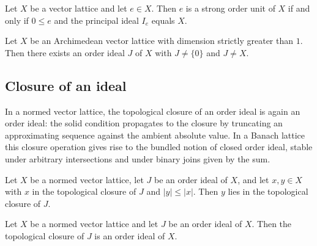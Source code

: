 \begin{theorem}
\label{thm:orderIdeal-strongOrderUnit-iff-principal-eq-top}
\leanok
{}
Let $X$ be a vector lattice and let $e \in X$. Then $e$ is a strong order
unit of $X$ if and only if $0 \le e$ and the principal ideal $I_e$ equals
$X$.
\end{theorem}

\begin{theorem}
\label{thm:orderIdeal-exists-proper-nontrivial}
\leanok
{}
Let $X$ be an Archimedean vector lattice with dimension strictly
greater than $1$. Then there exists an order ideal $J$ of $X$ with
$J \ne \{0\}$ and $J \ne X$.
\end{theorem}

\subsection{Closure of an ideal}

In a normed vector lattice, the topological closure of an order
ideal is again an order ideal: the solid condition propagates to
the closure by truncating an approximating sequence against the
ambient absolute value. In a Banach lattice this closure operation
gives rise to the bundled notion of closed order ideal, stable
under arbitrary intersections and under binary joins given by the
sum.

\begin{lemma}
\label{lem:orderIdeal-topologicalClosure-solid}
\leanok
{}
Let $X$ be a normed vector lattice, let $J$ be an order ideal of
$X$, and let $x, y \in X$ with $x$ in the topological closure of
$J$ and $\lvert y \rvert \le \lvert x \rvert$. Then $y$ lies in the
topological closure of $J$.
\end{lemma}

\begin{lemma}
\label{lem:orderIdeal-topologicalClosure}
\leanok
{}
Let $X$ be a normed vector lattice and let $J$ be an order ideal of
$X$. Then the topological closure of $J$ is an order ideal of $X$.
\end{lemma}


